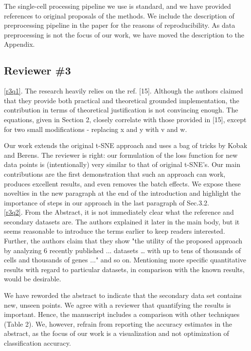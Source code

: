 \documentclass{article}
\newcounter{rtaskno}
\newcommand{\rtask}[1]{\refstepcounter{rtaskno}\label{#1}}
\newcommand{\reviewc}[2]{\begin{leftbar}\noindent\rtask{#1}\ref{#1}. #2\end{leftbar}}
\newcommand{\answer}[1]{\noindent #1\\[0mm]}
\newlength{\leftbarwidth}
\newlength{\leftbarsep}
\renewenvironment{leftbar}{%
    \def\FrameCommand{{\color{black}{\vrule width \leftbarwidth\relax\hspace {\leftbarsep}}}}%
    \MakeFramed {\advance \hsize -\width \FrameRestore }%
}{\endMakeFramed}
\begin{document}
\answer{
The single-cell processing pipeline we use is standard, and we have provided references to original proposals of the methods. We include the description of preprocessing pipeline in the paper for the reasons of reproducibility. As data preprocessing is not the focus of our work, we have moved the description to the Appendix.}


\subsection*{Reviewer \#3}

\reviewc{r3q1}{The research heavily relies on the ref. [15]. Although the authors claimed that they provide both practical and theoretical grounded implementation, the contribution in terms of theoretical justification is not convincing enough. The equations, given in Section 2, closely correlate with those provided in [15], except for two small modifications - replacing x and y with v and w. }

\answer{
Our work extends the original t-SNE approach and uses a bag of tricks by Kobak and Berens. The reviewer is right: our formulation of the loss function for new data points is (intentionally) very similar to that of original t-SNE's. Our main contributions are the first demonstration that such an approach can work, produces excellent results, and even removes the batch effects. We expose these novelties in the new paragraph at the end of the introduction and highlight the importance of steps in our approach in the last paragraph of Sec.3.2.
}


\reviewc{r3q2}{From the Abstract, it is not immediately clear what the reference and secondary datasets are. The authors explained it later in the main body, but it seems reasonable to introduce the terms earlier to keep readers interested. Further, the authors claim that they show "the utility of the proposed approach by analyzing 6 recently published ... datasets … with up to tens of thousands of cells and thousands of genes ..."  and so on. Mentioning more specific quantitative results with regard to particular datasets, in comparison with the known results, would be desirable. }

\answer{
We have reworded the abstract to indicate that the secondary data set contains new, unseen points. We agree with a reviewer that quantifying the results is important. Hence, the manuscript includes a comparison with other techniques (Table 2). We, however, refrain from reporting the accuracy estimates in the abstract, as the focus of our work is a visualization and not optimization of classification accuracy.
}
\end{document}
